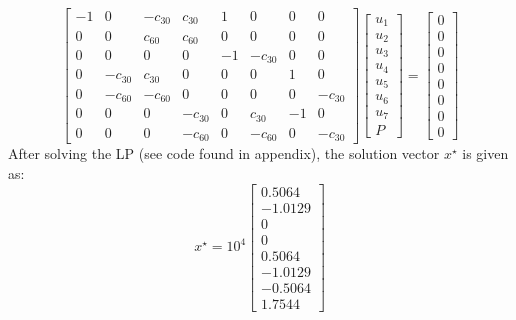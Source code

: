 \documentclass[12pt]{article}
\begin{document}
\begin{equation}
\left[
\begin{array}{cccccccc}
-1  & 0             & -c_{30}  &  c_{30}   &1     &0            &0   &0\\
0   & 0             &c_{60}     &c_{60}     &0     &0            &0   &0\\
0   &0              &0              &0              &-1    &-c_{30}  &0   &0\\
0   &-c_{30}   &c_{30}     &0              &0     &0             &1   &0\\
0   &-c_{60}   &-c_{60}    &0              &0    &0              &0   &-c_{30} \\
0   & 0             &0              &-c_{30}    &0    &c_{30}    &-1  &0\\
0   &0              &0              &-c_{60}    &0    &-c_{60}   &0   &-c_{30}
\end{array}
\right]
\left[
\begin{array}{c}
u_1\\
u_2\\
u_3\\
u_4\\
u_5\\
u_6\\
u_7\\
P
\end{array}
\right]
=
\left[
\begin{array}{c}
0\\
0\\
0\\
0\\
0\\
0\\
0\\
0
\end{array}
\right]
\end{equation}
After solving the LP (see code found in appendix), the solution vector $x^\star$ is given as:
\begin{equation}
\nonumber
x^\star = 10^4
\left[
\begin{array}{r}
0.5064\\
-1.0129\\
0\\
0\\
0.5064\\
-1.0129\\
-0.5064\\
1.7544
\end{array}
\right]
\end{equation}
\end{document}
